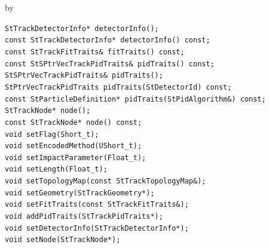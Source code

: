 \documentclass[twoside]{article}
\newcommand{\entrylabel}[1]{\mbox{\textbf{{#1}}}\hfil}%
\newenvironment{entry}
{\begin{list}{}%
    {\renewcommand{\makelabel}{\entrylabel}%
     \setlength{\labelwidth}{90pt}%
     \setlength{\leftmargin}{\labelwidth}
     \advance\leftmargin by \labelsep%
      }%
    }%
  {\end{list}}
\newcommand{\Entrylabel}[1]%
{\raisebox{0pt}[1ex][0pt]{\makebox[\labelwidth][l]%
    {\parbox[t]{\labelwidth}{\hspace{0pt}\textbf{{#1}}}}}}
\newenvironment{Entry}%
{\renewcommand{\entrylabel}{\Entrylabel}\begin{entry}}%
  {\end{entry}}
\begin{document}
\begin{Entry}
    \verb+StTrackDetectorInfo* detectorInfo();+\\
    \verb+const StTrackDetectorInfo* detectorInfo() const;+\\
    \verb+const StTrackFitTraits& fitTraits() const;+\\
    \verb+const StSPtrVecTrackPidTraits& pidTraits() const;+\\
    \verb+StSPtrVecTrackPidTraits& pidTraits();+\\
    \verb+StPtrVecTrackPidTraits pidTraits(StDetectorId) const;+\\
    \verb+const StParticleDefinition* pidTraits(StPidAlgorithm&) const;+\\
    \verb+StTrackNode* node();+\\
    \verb+const StTrackNode* node() const;+\\
    \verb+void setFlag(Short_t);+\\
    \verb+void setEncodedMethod(UShort_t);+\\
    \verb+void setImpactParameter(Float_t);+\\
    \verb+void setLength(Float_t);+\\
    \verb+void setTopologyMap(const StTrackTopologyMap&);+\\
    \verb+void setGeometry(StTrackGeometry*);+\\
    \verb+void setFitTraits(const StTrackFitTraits&);+\\
    \verb+void addPidTraits(StTrackPidTraits*);+\\
    \verb+void setDetectorInfo(StTrackDetectorInfo*);+\\
    \verb+void setNode(StTrackNode*);+\\
\end{Entry}
\clearpage
\end{document}
